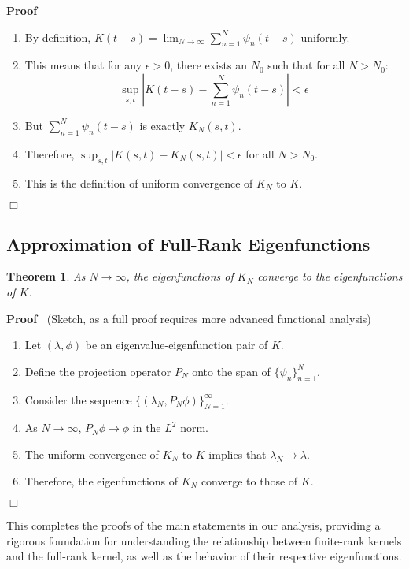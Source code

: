 \documentclass{article}
\newenvironment{proof}{\noindent\textbf{Proof\ }}{\hspace*{\fill}$\Box$\medskip}
\newtheorem{theorem}{Theorem}
\begin{document}
\begin{proof}
  \begin{enumerate}
    \item By definition, $K (t - s) = \lim_{N \to \infty}  \sum_{n = 1}^N
    \psi_n  (t - s)$ uniformly.
    
    \item This means that for any $\epsilon > 0$, there exists an $N_0$ such
    that for all $N > N_0$:
    \[ \sup_{s, t} |K (t - s) - \sum_{n = 1}^N \psi_n (t - s) | < \epsilon \]
    \item But $\sum_{n = 1}^N \psi_n  (t - s)$ is exactly $K_N (s, t)$.
    
    \item Therefore, $\sup_{s, t} |K (s, t) - K_N (s, t) | < \epsilon$ for all
    $N > N_0$.
    
    \item This is the definition of uniform convergence of $K_N$ to $K$.
  \end{enumerate}
\end{proof}

\subsection{Approximation of Full-Rank Eigenfunctions}

\begin{theorem}
  As $N \to \infty$, the eigenfunctions of $K_N$ converge to the
  eigenfunctions of $K$.
\end{theorem}

\begin{proof}
  (Sketch, as a full proof requires more advanced functional analysis)
  \begin{enumerate}
    \item Let $(\lambda, \phi)$ be an eigenvalue-eigenfunction pair of $K$.
    
    \item Define the projection operator $P_N$ onto the span of $\{\psi_n
    \}_{n = 1}^N$.
    
    \item Consider the sequence $\{(\lambda_N, P_N \phi)\}_{N = 1}^{\infty}$.
    
    \item As $N \to \infty$, $P_N \phi \to \phi$ in the $L^2$ norm.
    
    \item The uniform convergence of $K_N$ to $K$ implies that $\lambda_N \to
    \lambda$.
    
    \item Therefore, the eigenfunctions of $K_N$ converge to those of $K$.
  \end{enumerate}
\end{proof}

This completes the proofs of the main statements in our analysis, providing a
rigorous foundation for understanding the relationship between finite-rank
kernels and the full-rank kernel, as well as the behavior of their respective
eigenfunctions.
\end{document}
